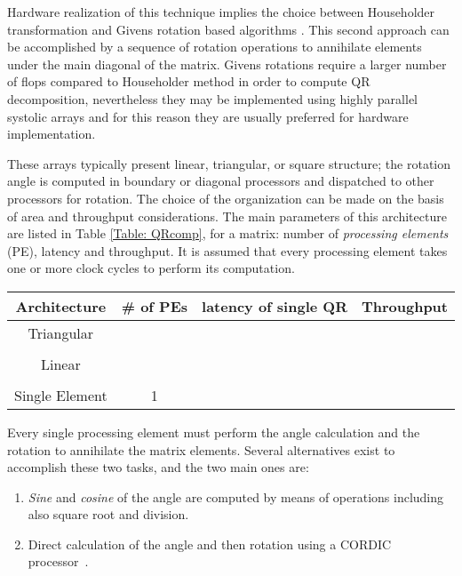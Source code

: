 \documentclass[12pt,onecolumn,draftclsnofoot]{IEEEtran}
\begin{document}
Hardware realization of this technique implies the choice between
Householder transformation and Givens rotation based algorithms
\cite{MxCom}. This second approach can be accomplished by a sequence
of rotation operations to annihilate elements under the main
diagonal of the matrix. Givens rotations require a larger number of
flops compared to Householder method in order to compute QR
decomposition, nevertheless they may be implemented using highly
parallel systolic arrays and for this reason they are usually
preferred for hardware implementation.

These arrays typically present linear, triangular, or square
structure; the rotation angle is computed in boundary or diagonal
processors and dispatched to other processors for rotation. The
choice of the organization can be made on the basis of area and
throughput considerations. The main parameters of this architecture
are listed in Table \ref{Table: QRcomp}, for a  matrix:
number of {\it processing elements} (PE), latency and throughput. It is
assumed that every processing element takes one or more clock cycles
to perform its computation.

\begin{table*}
\centering
\caption{QR decomposition: different array organization parameters - number of processing elements (PE),
latency and throughput}
\begin{tabular}{|c||c|c|c|} \hline
{\bf Architecture} &{\bf \# of PEs}& {\bf latency of single QR}& {\bf Throughput}\\ \hline \hline
Triangular &  &  & \\ \hline
 & &  & \\
Linear &  & & \\
& &  & \\ \hline
Single Element & 1 &  &  \\ \hline\end{tabular}
\label{Table: QRcomp}
\end{table*}


Every single processing element must perform the angle calculation
and the rotation to annihilate the matrix elements. Several
alternatives exist to accomplish these two tasks, and the two main
ones are:

\begin{enumerate}
\item {\it Sine} and {\it cosine} of the angle are computed by means of
operations including also square root and division.
\item Direct calculation of the angle and then rotation using a CORDIC
processor~\cite{CORDIC1}.
\end{enumerate}
\end{document}
